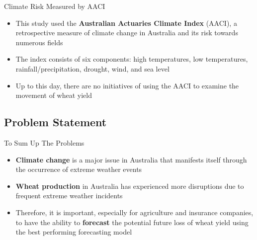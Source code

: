 \documentclass[aspectratio=169]{beamer}
\begin{document}

\begin{frame}{Climate Risk Measured by AACI}
    \begin{itemize}
        \item This study used the \textbf{Australian Actuaries Climate Index} (AACI), a retrospective measure of climate change in Australia and its risk towards numerous fields
        \item The index consists of six components: high temperatures, low temperatures, rainfall/precipitation, drought, wind, and sea level
        \item Up to this day, there are no initiatives of using the AACI to examine the movement of wheat yield 
    \end{itemize}
\end{frame}

\subsection{Problem Statement}
\begin{frame}{To Sum Up The Problems}
    \begin{itemize}
        \item \textbf{Climate change} is a major issue in Australia that manifests itself through the occurrence of extreme weather events
        \item \textbf{Wheat production} in Australia has experienced more disruptions due to frequent extreme weather incidents
        \item Therefore, it is important, especially for agriculture and insurance companies, to have the ability to \textbf{forecast} the potential future loss of wheat yield using the best performing forecasting model
    \end{itemize}
\end{frame}
\end{document}
